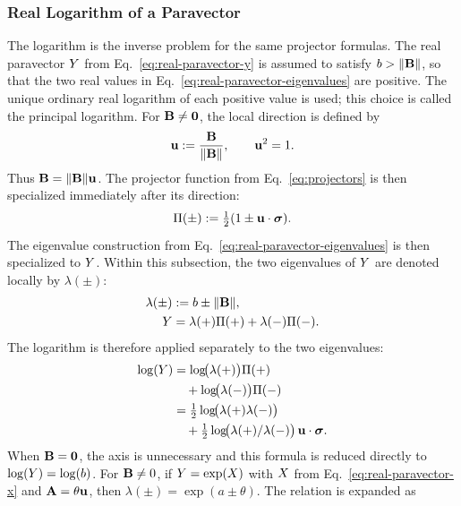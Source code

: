 \subsubsection{Real Logarithm of a Paravector}
The logarithm is the inverse problem for the same projector formulas. The
real paravector \(Y\) from Eq.\ \eqref{eq:real-paravector-y} is assumed
to satisfy \(b>\lVert\mathbf{B}\rVert\), so that the two real values in
Eq.\ \eqref{eq:real-paravector-eigenvalues} are positive. The unique ordinary
real logarithm of each positive value is used; this choice is called the
principal logarithm. For \(\mathbf{B}\neq\mathbf{0}\), the local direction is
defined by
\begin{equation}
\mathbf{u}:=\frac{\mathbf{B}}{\lVert\mathbf{B}\rVert},
\qquad
\mathbf{u}^2=1.
\label{eq:log-paravector-axis}
\end{equation}
Thus \(\mathbf{B}=\lVert\mathbf{B}\rVert \mathbf{u}\). The
projector function from Eq.\ \eqref{eq:projectors} is then specialized
immediately after its direction:
\begin{equation}
\Pi(\pm):=\tfrac12(1\pm \mathbf{u}\cdot\mathbf{\bm{\sigma}}).
\label{eq:log-paravector-projectors}
\end{equation}
The eigenvalue construction from
Eq.\ \eqref{eq:real-paravector-eigenvalues} is then specialized to
\(Y\). Within this subsection, the two eigenvalues of \(Y\) are
denoted locally by \(\lambda(\pm)\):
\begin{align}
\lambda(\pm) &:= b \pm \lVert\mathbf{B}\rVert,
\label{eq:log-paravector-eigenvalues}\\
Y &= \lambda(+)\Pi(+) + \lambda(-)\Pi(-).\notag
\end{align}
The logarithm is therefore applied separately to the two eigenvalues:
\begin{align}
\log(Y)
&= \log\!\bigl(\lambda(+)\bigr)\Pi(+)\notag\\
&\quad+\log\!\bigl(\lambda(-)\bigr)\Pi(-)\notag \\
&= \tfrac12 \log\!\bigl(\lambda(+)\lambda(-)\bigr)
\notag\\
&\quad+ \tfrac12 \log\!\bigl(\lambda(+)/\lambda(-)\bigr)
\,\mathbf{u}\cdot\mathbf{\bm{\sigma}}.
\label{eq:log-paravector}
\end{align}
When \(\mathbf{B}=\mathbf{0}\), the axis is unnecessary and this formula is
reduced directly to \(\log(Y)=\log(b)\).
For \(\mathbf{B}\neq0\), if \(Y=\exp(X)\) with \(X\) from
Eq.\ \eqref{eq:real-paravector-x} and \(\mathbf{A}=\theta\mathbf{u}\), then
\(\lambda(\pm)=\exp(a\pm\theta)\). The relation is expanded as
